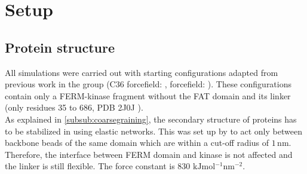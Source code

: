 \chapter{Setup}
\section{Protein structure}
All simulations were carried out with starting configurations adapted from previous work in the group (C36 forcefield: \textcite{pap003}, \martini{} forcefield: \textcite{sara}). These configurations contain only a FERM-kinase fragment without the FAT domain and its linker (only residues 35 to 686, PDB 2J0J \autocite{structFAK}).\\
As explained in \autoref{subsub:coarsegraining}, the secondary structure of proteins has to be stabilized in \martini{} using elastic networks. This was set up by \textcite{sara} to act only between backbone beads of the same domain which are within a cut-off radius of $1\,\si{\nano\metre}$. Therefore, the interface between FERM domain and kinase is not affected and the linker is still flexible. The force constant is 830 $\si{\kilo\joule\mole^{-1}\nano\meter^{-2}}$.
